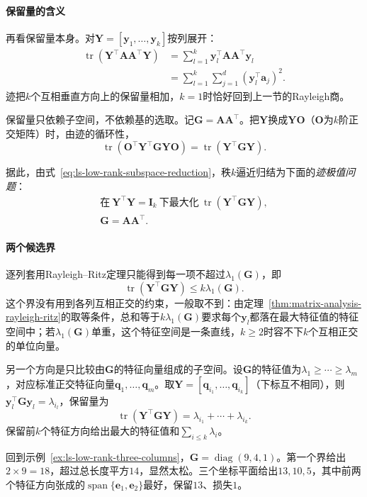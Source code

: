 \paragraph{保留量的含义}
再看保留量本身。对$\bm Y=[\bm y_1,\ldots,\bm y_k]$按列展开：
\[
 \begin{aligned}
 \operatorname{tr}(\bm Y^\top\bm A\bm A^\top\bm Y)
 &=\sum_{l=1}^k\bm y_l^\top\bm A\bm A^\top\bm y_l\\
 &=\sum_{l=1}^k\sum_{j=1}^d(\bm y_l^\top\bm a_j)^2 .
 \end{aligned}
\]
迹把$k$个互相垂直方向上的保留量相加，$k=1$时恰好回到上一节的Rayleigh商。

保留量只依赖子空间，不依赖基的选取。记$\bm G=\bm A\bm A^\top$。把$\bm Y$换成$\bm Y\bm O$（$\bm O$为$k$阶正交矩阵）时，由迹的循环性，
\[
 \operatorname{tr}(\bm O^\top\bm Y^\top\bm G\bm Y\bm O)=\operatorname{tr}(\bm Y^\top\bm G\bm Y).
\]

据此，由式~\eqref{eq:ls-low-rank-subspace-reduction}，秩$k$逼近归结为下面的\emph{迹极值问题}：
\[
 \begin{gathered}
 \text{在}\ \bm Y^\top\bm Y=\bm I_k\ \text{下最大化}\ \operatorname{tr}(\bm Y^\top\bm G\bm Y),\\
 \bm G=\bm A\bm A^\top .
 \end{gathered}
\]

\paragraph{两个候选界}
逐列套用Rayleigh--Ritz定理只能得到每一项不超过$\lambda_1(\bm G)$，即
\[
 \operatorname{tr}(\bm Y^\top\bm G\bm Y)\leq k\lambda_1(\bm G).
\]
这个界没有用到各列互相正交的约束，一般取不到：由定理~\ref{thm:matrix-analysis-rayleigh-ritz}的取等条件，总和等于$k\lambda_1(\bm G)$要求每个$\bm y_l$都落在最大特征值的特征空间中；若$\lambda_1(\bm G)$单重，这个特征空间是一条直线，$k\geq2$时容不下$k$个互相正交的单位向量。

另一个方向是只比较由$\bm G$的特征向量组成的子空间。设$\bm G$的特征值为$\lambda_1\geq\cdots\geq\lambda_m$，对应标准正交特征向量$\bm q_1,\ldots,\bm q_m$。取$\bm Y=[\bm q_{i_1},\ldots,\bm q_{i_k}]$（下标互不相同），则$\bm y_l^\top\bm G\bm y_l=\lambda_{i_l}$，保留量为
\[
 \operatorname{tr}(\bm Y^\top\bm G\bm Y)=\lambda_{i_1}+\cdots+\lambda_{i_k}.
\]
保留前$k$个特征方向给出最大的特征值和$\sum_{i\leq k}\lambda_i$。

回到示例~\ref{ex:ls-low-rank-three-columns}，$\bm G=\operatorname{diag}(9,4,1)$。第一个界给出$2\times9=18$，超过总长度平方$14$，显然太松。三个坐标平面给出$13,10,5$，其中前两个特征方向张成的$\operatorname{span}\{\bm e_1,\bm e_2\}$最好，保留$13$、损失$1$。

